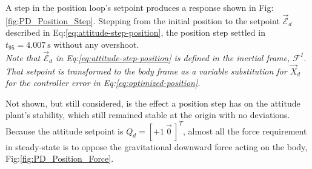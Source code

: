 A step in the position loop's setpoint produces a response shown in Fig:\ref{fig:PD_Position_Step}. Stepping from the initial position to the setpoint $\vec{\mathcal{E}}_d$ described in Eq:\ref{eq:attitude-step-position}, the position step settled in $t_{95}=4.007~\text{s}$ without any overshoot. 
\\
\emph{\color{Gray}Note that $\vec{\mathcal{E}}_d$ in Eq:\ref{eq:attitude-step-position} is defined in the inertial frame, $\mathcal{F}^{I}$. That setpoint is transformed to the body frame as a variable substitution for $\vec{X}_d$ for the controller error in Eq:\ref{eq:optimized-position}.}
\par
Not shown, but still considered, is the effect a position step has on the attitude plant's stability, which still remained stable at the origin with no deviations. Because the attitude setpoint is $Q_d=[+1~\vec{0}\hspace{2pt}]^T$, almost all the force requirement in steady-state is to oppose the gravitational downward force acting on the body, Fig:\ref{fig:PD_Position_Force}.
